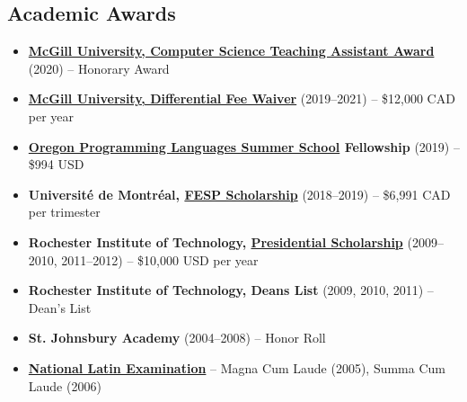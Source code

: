 \documentclass[letterpaper,11pt]{article}
\newcommand{\resumeItem}[2]{
  \item\small{\textbf{#1}{ #2 }}
}
\newcommand{\resumeSubItem}[2]{\resumeItem{#1}{#2}}
\newcommand{\resumeSubHeadingListStart}{\begin{itemize}[leftmargin=*]}
\newcommand{\resumeSubHeadingListEnd}{\end{itemize}}
\begin{document}
\begin{justify}
\section{Academic Awards}
\resumeSubHeadingListStart
\resumeSubItem{\href{https://www.cs.mcgill.ca/academic/ta/awards/winners/}{McGill University, Computer Science Teaching Assistant Award}}{(2020) -- Honorary Award}
\resumeSubItem{\href{https://www.mcgill.ca/expmed/funding-and-awards/differential-fee-waivers}{McGill University, Differential Fee Waiver}}{(2019--2021) -- \$12,000 CAD per year}
\resumeSubItem{\href{https://www.cs.uoregon.edu/research/summerschool/summer19/}{Oregon Programming Languages Summer School} Fellowship}{(2019) -- \$994 USD}
\resumeSubItem{Universit\'e de Montr\'eal, \href{https://esp.umontreal.ca/english/what-you-need-to-know/international/scholarship/}{FESP Scholarship}}{(2018--2019) -- \$6,991 CAD per trimester}
\resumeSubItem{Rochester Institute of Technology, \href{https://www.rit.edu/admissions/aid/merit-based-scholarships}{Presidential Scholarship}}{(2009--2010, 2011--2012) -- \$10,000 USD per year}
\resumeSubItem{Rochester Institute of Technology, Deans List}{(2009, 2010, 2011) -- Dean's List}
\resumeSubItem{St. Johnsbury Academy}{(2004--2008) -- Honor Roll}
\resumeSubItem{\href{https://www.nle.org/}{National Latin Examination}}{-- Magna Cum Laude (2005), Summa Cum Laude (2006)}
\resumeSubHeadingListEnd


\end{justify}
\end{document}

